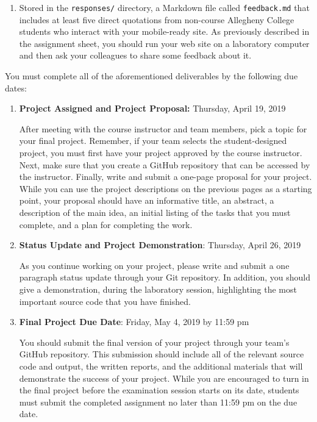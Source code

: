 \documentclass[11pt]{article}
\newcommand{\program}[1]{\lstinline{#1}}
\begin{document}
\begin{enumerate}
\item Stored in the \program{responses/} directory, a Markdown file called
  \program{feedback.md} that includes at least five direct quotations from
  non-course Allegheny College students who interact with your mobile-ready
  site. As previously described in the assignment sheet, you should run your web
  site on a laboratory computer and then ask your colleagues to share some
  feedback about it.

\end{enumerate}

\noindent
You must complete all of the aforementioned deliverables by the following due dates:

\begin{enumerate}

  \setlength{\itemsep}{0in}

  \item {\bf Project Assigned and Project Proposal:} Thursday, April 19, 2019

    After meeting with the course instructor and team members, pick a topic for
    your final project. Remember, if your team selects the student-designed
    project, you must first have your project approved by the course instructor.
    Next, make sure that you create a GitHub repository that can be accessed by
    the instructor. Finally, write and submit a one-page proposal for your
    project. While you can use the project descriptions on the previous pages as
    a starting point, your proposal should have an informative title, an
    abstract, a description of the main idea, an initial listing of the tasks
    that you must complete, and a plan for completing the work.

  \item {\bf Status Update and Project Demonstration}: Thursday, April 26, 2019

    As you continue working on your project, please write and submit a one
    paragraph status update through your Git repository. In addition, you should
    give a demonstration, during the laboratory session, highlighting the most
    important source code that you have finished.

  \item {\bf Final Project Due Date}: Friday, May 4, 2019 by 11:59 pm

    You should submit the final version of your project through your team's
    GitHub repository. This submission should include all of the relevant source
    code and output, the written reports, and the additional materials that will
    demonstrate the success of your project. While you are encouraged to turn in
    the final project before the examination session starts on its date,
    students must submit the completed assignment no later than 11:59 pm on the
    due date.

\end{enumerate}
\end{document}
